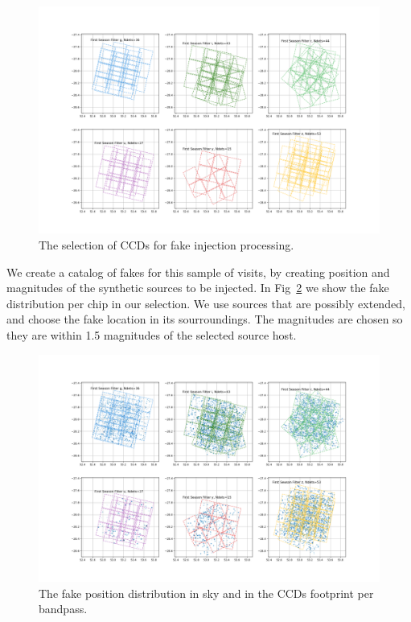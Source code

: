 \begin{figure}
    \centering
    \includegraphics[width=0.95\linewidth]{figures/sampled_df_chip_observations.png}
    \caption{The selection of CCDs for fake injection processing.}
    \label{fig:sampled_df_chip_observations}
\end{figure}


We create a catalog of fakes for this sample of visits, by creating position and magnitudes of the synthetic sources to be injected. In Fig~\ref{fig:sampled_df_chip_observations_plusfakes} we show the fake distribution per chip in our selection. We use sources that are possibly extended, and choose the fake location in its sourroundings. The magnitudes are chosen so they are within 1.5 magnitudes of the selected source host.

\begin{figure}
    \centering
    \includegraphics[width=0.95\linewidth]{figures/sampled_df_chip_observations_plusfakes.png}
    \caption{The fake position distribution in sky and in the CCDs footprint per bandpass.}
    \label{fig:sampled_df_chip_observations_plusfakes}
\end{figure}

